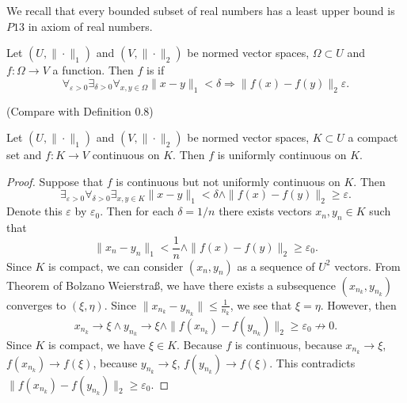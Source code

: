 \documentclass[10pt]{article}
\let\emph\relax %
\begin{document}
  \begin{remark}
    We recall that every bounded subset of real numbers has a least upper bound is $P13$ in axiom of real numbers.
  \end{remark}

  \begin{definition}
    Let $(U,\|\cdot\|_{1})$ and $(V,\|\cdot\|_{2})$ be normed vector spaces, $\Omega \subset U$ and $f:\Omega \rightarrow V$ a function.
    Then $f$ is \emph{uniformly continuous in $\Omega$} if
    \begin{equation}
      \mathop{\forall}_{\varepsilon > 0} \mathop{\exists}_{\delta > 0} \mathop{\forall}_{x,y \in \Omega}
      \|x-y\|_{1} < \delta \Rightarrow \|f(x)-f(y)\|_{2}  \varepsilon.
    \end{equation}
  \end{definition}
  (Compare with Definition $0.8$)

  \begin{theorem}
    Let $(U,\|\cdot\|_{1})$ and $(V,\|\cdot\|_{2})$ be normed vector spaces, $K \subset U$ a compact set and $f:K \rightarrow V$ continuous on $K$.
    Then $f$ is uniformly continuous on $K$.
  \end{theorem}
  
  \begin{proof}
    Suppose that $f$ is continuous but not uniformly continuous on $K$. Then
    \[
      \mathop{\exists}_{\varepsilon > 0}\mathop{\forall}_{\delta > 0}\mathop{\exists}_{x,y \in K}
      \|x-y\|_{1} < \delta \wedge \|f(x)-f(y)\|_{2} \geq \varepsilon.  
    \]
    Denote this $\varepsilon$ by $\varepsilon_{0}$. Then for each $\delta = 1/n$ there exists vectors $x_{n},y_{n} \in K$ such that
    \[
      \|x_{n}-y_{n}\|_{1} < \frac{1}{n} \wedge \|f(x)-f(y)\|_{2} \geq \varepsilon_{0}.  
    \]
    Since $K$ is compact, we can consider $(x_{n},y_{n})$ as a sequence of $U^{2}$ vectors. From Theorem of Bolzano Weierstra{\ss},
    we have there exists a subsequence $(x_{n_{k}},y_{n_{k}})$ converges to $(\xi, \eta)$.
    Since $\|x_{n_{k}}-y_{n_{k}}\| \leq \frac{1}{n_{k}}$, we see that $\xi = \eta$. 
    However, then
    \[
      x_{n_{k}} \rightarrow \xi \wedge y_{n_{k}} \rightarrow \xi 
      \wedge \|f(x_{n_{k}})-f(y_{n_{k}})\|_{2} \geq \varepsilon_{0} \nrightarrow 0.  
    \]
    Since $K$ is compact, we have $\xi \in K$. Because $f$ is continuous, because $x_{n_{k}} \rightarrow \xi$, 
    $f(x_{n_{k}}) \rightarrow f(\xi)$, because $y_{n_{k}} \rightarrow \xi$, $f(y_{n_{k}}) \rightarrow f(\xi)$.
    This contradicts $\|f(x_{n_{k}})-f(y_{n_{k}})\|_{2} \geq \varepsilon_{0}$.
  \end{proof}
  
\end{document}
